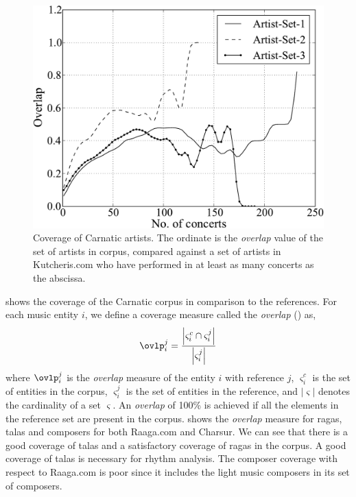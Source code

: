%
\begin{figure}[t]
\centering
\includegraphics[scale=0.6]{./figs/dstats/artist-coverage-vs-performances.pdf}
\caption[Coverage of the Carnatic artists]{Coverage of Carnatic artists. The ordinate is the \textit{overlap} value of the set of artists in corpus, compared against a set of artists in Kutcheris.com who have performed in at least as many concerts as the abscissa.}
\label{fig:corpora:artistCoverage}
\end{figure}

 shows the coverage of the Carnatic corpus in comparison to the references. For each music entity $i$, we define a coverage measure called the \textit{overlap} (\ovlp) as,
\begin{equation}
\label{eqn:overlap}
\ovlp_i^j = \frac{\left| \varsigma_i^c \cap \varsigma_i^j\right|}{\left|\varsigma_i^j\right|}
\end{equation}
where $\ovlp_i^j$ is the \textit{overlap} measure of the entity $i$ with reference $j$, $\varsigma_i^c$ is the set of entities in the corpus, $\varsigma_i^j$ is the set of entities in the reference, and $\left| \varsigma \right|$ denotes the cardinality of a set $\varsigma$. An \textit{overlap} of 100\% is achieved if all the elements in the reference set are present in the corpus.  shows the \textit{overlap} measure for \glspl{raga}, \glspl{tala} and composers for both Raaga.com and Charsur. We can see that there is a good coverage of \glspl{tala} and a satisfactory coverage of \glspl{raga} in the corpus. A good coverage of \glspl{tala} is necessary for rhythm analysis. The composer coverage with respect to Raaga.com is poor since it includes the light music composers in its set of composers. 

